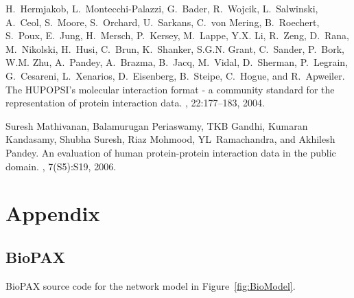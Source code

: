 \documentclass[a4paper,10pt,titlepage]{article}
\begin{document}
\begin{thebibliography}{10}
H.~Hermjakob, L.~Montecchi-Palazzi, G.~Bader, R.~Wojcik, L.~Salwinski, A.~Ceol,
  S.~Moore, S.~Orchard, U.~Sarkans, C.~{von Mering}, B.~Roechert, S.~Poux,
  E.~Jung, H.~Mersch, P.~Kersey, M.~Lappe, Y.X. Li, R.~Zeng, D.~Rana,
  M.~Nikolski, H.~Husi, C.~Brun, K.~Shanker, S.G.N. Grant, C.~Sander, P.~Bork,
  W.M. Zhu, A.~Pandey, A.~Brazma, B.~Jacq, M.~Vidal, D.~Sherman, P.~Legrain,
  G.~Cesareni, L.~Xenarios, D.~Eisenberg, B.~Steipe, C.~Hogue, and R.~Apweiler.
\newblock The {HUPOPSI's} molecular interaction format - a community standard
  for the representation of protein interaction data.
, 22:177--183, 2004.

Suresh Mathivanan, Balamurugan Periaswamy, TKB Gandhi, Kumaran Kandasamy,
  Shubha Suresh, Riaz Mohmood, YL~Ramachandra, and Akhilesh Pandey.
\newblock An evaluation of human protein-protein interaction data in the public
  domain.
, 7(S5):S19, 2006.

\end{thebibliography}

\newpage

\section*{Appendix}


\subsection*{BioPAX}

BioPAX source code for the network model in Figure~\ref{fig:BioModel}.
\end{document}
